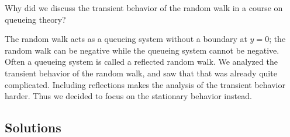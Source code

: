 \begin{exercise}[201907]
 Why did we discuss the transient behavior of the random walk in a course on queueing theory? 

\begin{solution}
 The random walk acts as a queueing system without a boundary at $y=0$; the random walk can be negative while the queueing system cannot be negative.
 Often a queueing system is called a reflected random walk.
 We analyzed the transient behavior of the random walk, and saw that that was already quite complicated.
 Including reflections makes the analysis of the transient behavior harder.
 Thus we decided to focus on the stationary behavior instead.
\end{solution}
\end{exercise}



\subsection*{Solutions}




